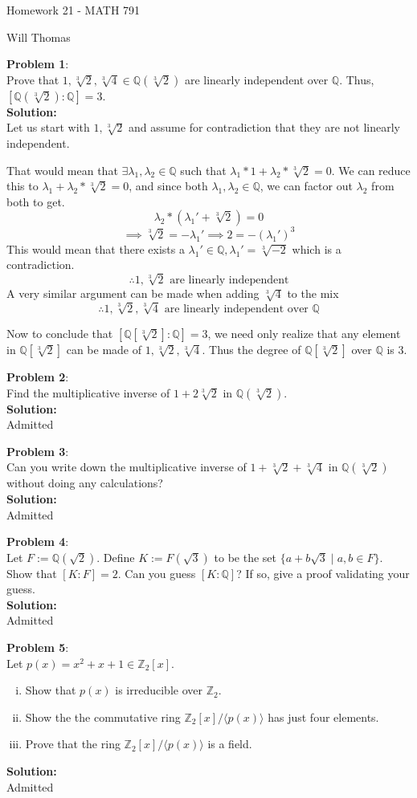 \documentclass[11pt]{article}
\newcommand{\prob}[3]{\begin{flushleft}
        \textbf{Problem #1}: \\
        #2 
		\textbf{Solution:} 
		#3

\end{flushleft}}
\newcommand{\lr}[1]{
  \langle #1 \rangle
}
\newcommand{\makeHWtitle}[1]{
    \begin{center}
    \Large{Homework #1 - MATH 791} 
        \vspace{5pt}
        
        \normalsize{Will Thomas}
        \vspace{5pt}
    \end{center}
}
\begin{document}
\makeHWtitle{21}

\prob{1}{
  Prove that $1, \sqrt[3]{2}, \sqrt[3]{4} \in \mathbb{Q}(\sqrt[3]{2})$
  are linearly independent over $\mathbb{Q}$.
  Thus, $[\mathbb{Q}(\sqrt[3]{2}) : \mathbb{Q}] = 3$. \\
}{\\
  Let us start with $1, \sqrt[3]{2}$ and assume for contradiction that they are not linearly independent.

  That would mean that $\exists \lambda_1, \lambda_2 \in \mathbb{Q}$ such that $\lambda_1 * 1 + \lambda_2 * \sqrt[3]{2} = 0$.
  We can reduce this to $\lambda_1 + \lambda_2 * \sqrt[3]{2} = 0$, and since both $\lambda_1, \lambda_2 \in \mathbb{Q}$, we can factor out $\lambda_2$ from both to get.
  $$\lambda_2 * (\lambda_1' + \sqrt[3]{2}) = 0$$
  $$\implies \sqrt[3]{2} = - \lambda_1' \implies 2 = - (\lambda_1')^3$$
  This would mean that there exists a $\lambda_1' \in \mathbb{Q}, \lambda_1' = \sqrt[3]{-2}$
  which is a contradiction.
  $$\therefore 1, \sqrt[3]{2} \text{ are linearly independent}$$
  A very similar argument can be made when adding $\sqrt[3]{4}$ to the mix
  $$\therefore 1, \sqrt[3]{2}, \sqrt[3]{4} \text{ are linearly independent over $\mathbb{Q}$}$$

  Now to conclude that $[\mathbb{Q}[\sqrt[3]{2}] : \mathbb{Q}] = 3$, we need only realize that
  any element in $\mathbb{Q}[\sqrt[3]{2}]$ can be made of $1, \sqrt[3]{2}, \sqrt[3]{4}$.
  Thus the degree of $\mathbb{Q}[\sqrt[3]{2}]$ over $\mathbb{Q}$ is $3$.
}

\prob{2}{
  Find the multiplicative inverse of $1 + 2 \sqrt[3]{2}$ in $\mathbb{Q}(\sqrt[3]{2})$. \\
}{\\
  Admitted
}

\prob{3}{
  Can you write down the multiplicative inverse of $1 + \sqrt[3]{2} + \sqrt[3]{4}$ in $\mathbb{Q}(\sqrt[3]{2})$ without doing any calculations? \\
}{\\
  Admitted
}

\prob{4}{
  Let $F := \mathbb{Q}(\sqrt{2})$. Define $K := F(\sqrt{3})$ to be the set $\{ a + b \sqrt{3} \mid a, b \in F \}$. Show that $[K : F] = 2$.
  Can you guess $[K : \mathbb{Q}]$? If so, give a proof validating your guess. \\
}{\\
  Admitted
}

\prob{5}{
Let $p(x) = x^2 + x + 1 \in \mathbb{Z}_2[x]$.
\begin{enumerate}[(i)]
  \item Show that $p(x)$ is irreducible over $\mathbb{Z}_2$.
  \item Show the the commutative ring $\mathbb{Z}_2[x] / \lr{p(x)}$ has just four elements.
  \item Prove that the ring $\mathbb{Z}_2[x] / \lr{p(x)}$ is a field.
\end{enumerate}
}{\\
Admitted
}
\end{document}
